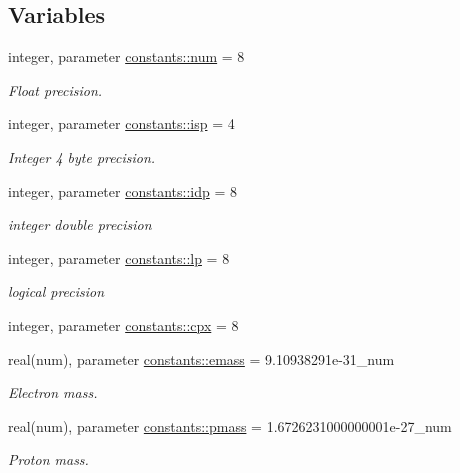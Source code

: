 \subsection*{Variables}
\begin{DoxyCompactItemize}
\item 
integer, parameter \hyperlink{namespaceconstants_afe19f7f8af171411c51fb763b36e3823}{constants\+::num} = 8
\begin{DoxyCompactList}\small\item\em Float precision. \end{DoxyCompactList}\item 
integer, parameter \hyperlink{namespaceconstants_a5a2ae450a00d2a29f9b70dcb776f7a2f}{constants\+::isp} = 4
\begin{DoxyCompactList}\small\item\em Integer 4 byte precision. \end{DoxyCompactList}\item 
integer, parameter \hyperlink{namespaceconstants_ae345db51770e3628e6aaf76e6a45e160}{constants\+::idp} = 8
\begin{DoxyCompactList}\small\item\em integer double precision \end{DoxyCompactList}\item 
integer, parameter \hyperlink{namespaceconstants_abcbe699dae64804bc375533c0f40c6b1}{constants\+::lp} = 8
\begin{DoxyCompactList}\small\item\em logical precision \end{DoxyCompactList}\item 
integer, parameter \hyperlink{namespaceconstants_a5709f0ae2ee52b1906446ad25ed0f587}{constants\+::cpx} = 8
\item 
real(num), parameter \hyperlink{namespaceconstants_ad39536f583f0861abb2fb19a27c56fc8}{constants\+::emass} = 9.\+10938291e-\/31\+\_\+num
\begin{DoxyCompactList}\small\item\em Electron mass. \end{DoxyCompactList}\item 
real(num), parameter \hyperlink{namespaceconstants_a44f3d8cbf9c39db63d7533d985cc51c3}{constants\+::pmass} = 1.\+6726231000000001e-\/27\+\_\+num
\begin{DoxyCompactList}\small\item\em Proton mass. \end{DoxyCompactList}\item 

\end{DoxyCompactItemize}
